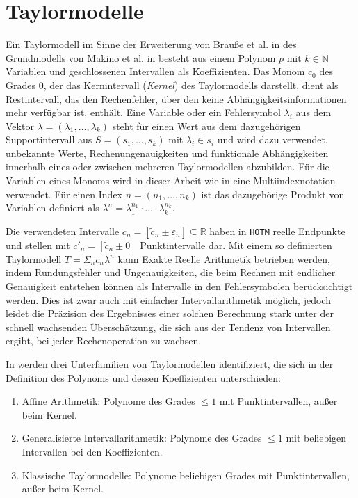 
\section{Taylormodelle}
Ein Taylormodell im Sinne der Erweiterung von Brauße et al. in \cite{DBLP:conf/macis/BrausseKM15} des Grundmodells von Makino et al. in \cite{makino2001} besteht aus einem Polynom $p$ mit $k\in \mathbb{N}$ Variablen und geschlossenen Intervallen als Koeffizienten. Das Monom $c_0$ des Grades 0, der das Kernintervall (\textit{Kernel}) des Taylormodells darstellt, dient als Restintervall, das den Rechenfehler, über den keine Abhängigkeitsinformationen mehr verfügbar ist, enthält. Eine Variable oder ein Fehlersymbol $\lambda_i$ aus dem Vektor $\lambda = (\lambda_1, \dots, \lambda_k)$ steht für einen Wert aus dem dazugehörigen Supportintervall aus $S=(s_1, \dots, s_k)$ mit $\lambda_i \in s_i$ und wird dazu verwendet, unbekannte Werte, Rechenungenauigkeiten und funktionale Abhängigkeiten innerhalb eines oder zwischen mehreren Taylormodellen abzubilden. Für die Variablen eines Monoms wird in dieser Arbeit wie in \cite{DBLP:conf/macis/BrausseKM15} eine Multiindexnotation verwendet. Für einen Index $n=(n_1,\dots,n_k)$ ist das dazugehörige Produkt von Variablen definiert als $\lambda^n=\lambda_1^{n_1} \cdot \ldots \cdot \lambda_k^{n_k} $.  


Die verwendeten Intervalle $c_n = [\tilde{c}_n \pm \varepsilon_n] \subseteq \mathbb{R}$ haben in \verb+HOTM+ reelle Endpunkte und stellen mit $c'_n = [\tilde{c}_n \pm 0]$ Punktintervalle dar. Mit einem so definierten Taylormodell $T=\Sigma_n c_n \lambda^n$ kann Exakte Reelle Arithmetik betrieben werden, indem Rundungsfehler und Ungenauigkeiten, die beim Rechnen mit endlicher Genauigkeit entstehen können als Intervalle in den Fehlersymbolen berücksichtigt werden. Dies ist zwar auch mit einfacher Intervallarithmetik möglich, jedoch leidet die Präzision des Ergebnisses einer solchen Berechnung stark unter der schnell wachsenden Überschätzung, die sich aus der Tendenz von Intervallen ergibt, bei jeder Rechenoperation zu wachsen.


In \cite{DBLP:conf/macis/BrausseKM15} werden drei Unterfamilien von Taylormodellen identifiziert, die sich in der Definition des Polynoms und dessen Koeffizienten unterschieden:
\begin{enumerate}
 \item Affine Arithmetik: Polynome des Grades $\leq 1$ mit Punktintervallen, außer beim Kernel.
 \item Generalisierte Intervallarithmetik: Polynome des Grades $\leq 1$ mit beliebigen Intervallen bei den Koeffizienten. \label{tm2}
 \item Klassische Taylormodelle: Polynome beliebigen Grades mit Punktintervallen, außer beim Kernel. \label{tm3}
\end{enumerate}

